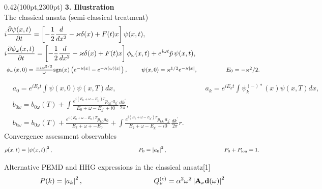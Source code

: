 \documentclass[20pt]{beamer}
\begin{document}
\begin{frame}
\begin{textblock*}{0.42\textwidth}(100pt,2300pt)
{\huge\textbf {3. Illustration}} \\\vspace{30pt}
{\small The classical ansatz (semi-classical treatment)}
\begin{align}
 & i\frac{\partial \psi(x,t)}{\partial t}
 =  \left[ -\frac{1}{2}\frac{d}{dx^2} -\varkappa\delta(x)  %
 + F(t)x\right]\psi(x,t),  \hspace{20pt} \nonumber\\
& i\frac{\partial \phi_\omega(x,t)}{\partial t}
 =  \left[ -\frac{1}{2}\frac{d}{dx^2} -\varkappa\delta(x) +  F(t)x\right]\phi_\omega(x,t)
  + e^{i\omega t}\hat{p}\,\psi(x,t), \hspace{40pt}  \\
   & \mbox{ \footnotesize $\phi_\omega (x,0) = \frac{-i\varkappa^{3/2}}{\omega}
{\rm sgn}(x)\left(e^{-\varkappa|x|} - e^{-\varkappa(\omega)|x|}\right),
\hspace{20pt}  \psi(x,0) = \varkappa^{1/2}e^{-\varkappa|x|}$, 
\hspace{40pt}\footnotesize $E_0 = -\varkappa^2/2$.}\nonumber
\end{align}

{\footnotesize
\begin{align}
 & a_0 = e^{iE_k t} \int \psi(x,0)\psi(x,T)dx, \hspace{150pt}
 a_k = e^{iE_k t} \int \psi_k^{(-)*}(x)\psi(x,T)dx, \nonumber \\
 & b_{0\omega} = b_{0\omega}(T) 
+ \int \frac{e^{i(E_0+\omega-E_{k^\prime})T}
p_{0k^\prime}a_{k^\prime}}{E_0 + \omega -E_{k^\prime} + i0}
\frac{dk^\prime}{2\pi},\nonumber \\
& b_{k\omega} = b_{0\omega}(T) +  \frac{e^{i(E_0+\omega-E_0)T}p_{k0}a_0}
{E_k + \omega +-E_0}
+ \int \frac{e^{i(E_k+\omega-E_{k^\prime})T}
p_{kk^\prime}a_{k^\prime}}{E_k + \omega -E_{k^\prime} + i0}
\frac{dk^\prime}{2\pi}r. \nonumber
\end{align}
}
\vspace{10pt}
Convergence assessment observables
\begin{equation}
\rho(x,t) = \left| \psi(x,t) \right|^2, \hspace{150pt}
P_0 = \left| a_0 \right|^2, \hspace{100pt}
P_0 + P_{\rm ion} = 1. \nonumber
\end{equation}

Alternative PEMD and HHG expressions in the classical ansatz[1]
\begin{equation}
P(k) = \left| a_k \right|^2, \hspace{100pt}
Q_\nu^{(c)} = \alpha^2\omega^2
   \left| \boldsymbol{\rm A}_\nu \boldsymbol{\rm d}(\omega)\right|^2 \nonumber
\end{equation}


\end{textblock*}
\end{frame}
\end{document}
